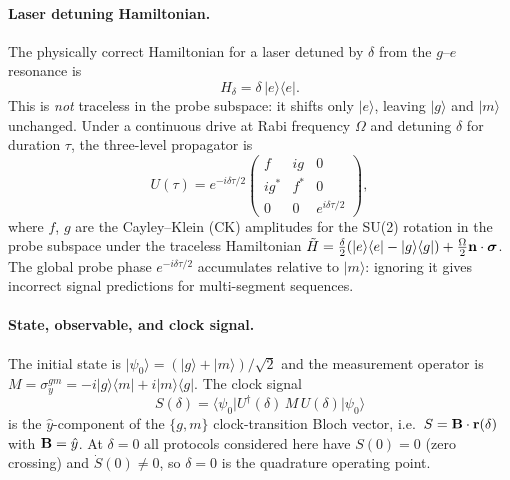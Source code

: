 \documentclass[12pt]{article}
\begin{document}
\paragraph{Laser detuning Hamiltonian.}
The physically correct Hamiltonian for a laser detuned by $\delta$ from the
$g$--$e$ resonance is
\begin{equation}
    H_\delta = \delta\,\lvert e\rangle\langle e\rvert.
    \label{eq:hamiltonian}
\end{equation}
This is \emph{not} traceless in the probe subspace: it shifts only
$\lvert e\rangle$, leaving $\lvert g\rangle$ and $\lvert m\rangle$ unchanged.
Under a continuous drive at Rabi frequency $\Omega$ and detuning $\delta$ for
duration $\tau$, the three-level propagator is
\begin{equation}
    U(\tau) = e^{-i\delta\tau/2}
    \begin{pmatrix}
        f & ig & 0 \\
        ig^* & f^* & 0 \\
        0 & 0 & e^{i\delta\tau/2}
    \end{pmatrix},
    \label{eq:propagator}
\end{equation}
where $f$, $g$ are the Cayley--Klein (CK) amplitudes for the SU(2) rotation in
the probe subspace under the traceless Hamiltonian
$\tilde{H} = \tfrac{\delta}{2}(\lvert e\rangle\langle e\rvert -
\lvert g\rangle\langle g\rvert) + \tfrac{\Omega}{2}\vb{n}\cdot\boldsymbol{\sigma}$.
The global probe phase $e^{-i\delta\tau/2}$ accumulates relative to
$\lvert m\rangle$: ignoring it gives incorrect signal predictions for
multi-segment sequences.

\paragraph{State, observable, and clock signal.}
The initial state is
$\lvert\psi_0\rangle = (\lvert g\rangle+\lvert m\rangle)/\sqrt{2}$
and the measurement operator is
$M = \sigma_y^{gm} = -i\lvert g\rangle\langle m\rvert + i\lvert m\rangle\langle g\rvert$.
The clock signal
\begin{equation}
    S(\delta) = \langle\psi_0\rvert U^\dagger(\delta)\,M\,U(\delta)\lvert\psi_0\rangle
    \label{eq:signal}
\end{equation}
is the $\hat{y}$-component of the $\{g,m\}$ clock-transition Bloch vector,
i.e.\ $S = \vb{B}\cdot\vb{r}(\delta)$ with $\vb{B} = \hat{y}$.
At $\delta = 0$ all protocols considered here have $S(0) = 0$ (zero crossing)
and $\dot{S}(0) \neq 0$, so $\delta = 0$ is the quadrature operating point.
\end{document}
